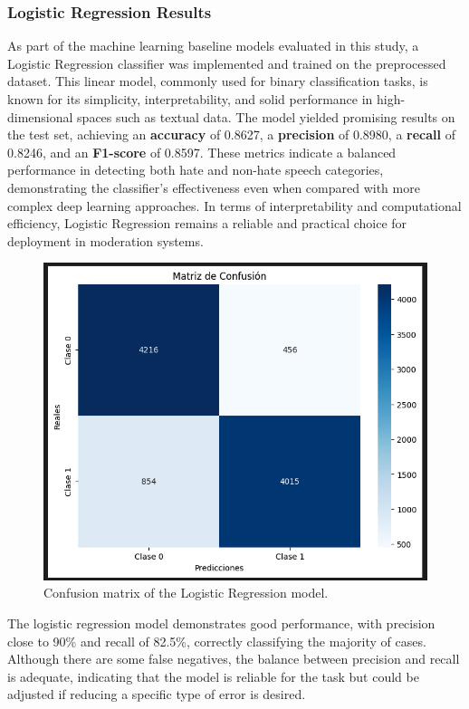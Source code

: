 \subsubsection{Logistic Regression Results}
\label{sec:logistic_regression_results}

As part of the machine learning baseline models evaluated in this study, a Logistic Regression classifier was implemented and trained on the preprocessed dataset. This linear model, commonly used for binary classification tasks, is known for its simplicity, interpretability, and solid performance in high-dimensional spaces such as textual data. The model yielded promising results on the test set, achieving an \textbf{accuracy} of 0.8627, a \textbf{precision} of 0.8980, a \textbf{recall} of 0.8246, and an \textbf{F1-score} of 0.8597. These metrics indicate a balanced performance in detecting both hate and non-hate speech categories, demonstrating the classifier's effectiveness even when compared with more complex deep learning approaches. In terms of interpretability and computational efficiency, Logistic Regression remains a reliable and practical choice for deployment in moderation systems.

\begin{figure}[H]
    \centering
    \includegraphics[width=0.7\linewidth]{images/confusion_matrix_logisticregression.png} 
    \caption{Confusion matrix of the Logistic Regression model.}
    \label{fig:confusion_matrix_logistic_regression}
\end{figure}

The logistic regression model demonstrates good performance, with precision close to 90\% and recall of 82.5\%, correctly classifying the majority of cases. Although there are some false negatives, the balance between precision and recall is adequate, indicating that the model is reliable for the task but could be adjusted if reducing a specific type of error is desired.